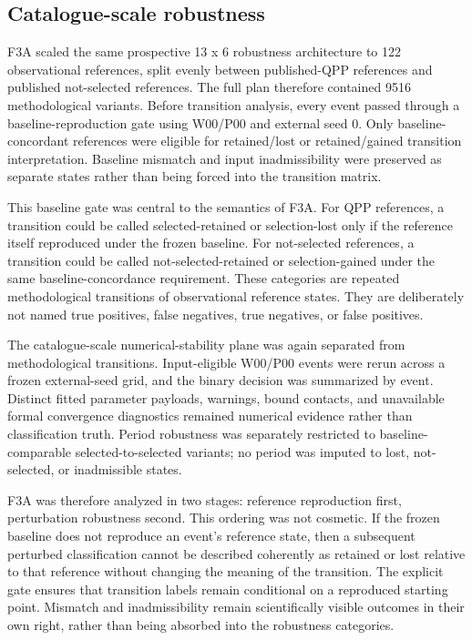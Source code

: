 \documentclass[11pt,a4paper]{article}
\begin{document}
\subsection{Catalogue-scale robustness}
F3A scaled the same prospective 13 x 6 robustness architecture to 122 observational references, split evenly between published-QPP references and published not-selected references. The full plan therefore contained 9516 methodological variants. Before transition analysis, every event passed through a baseline-reproduction gate using W00/P00 and external seed 0. Only baseline-concordant references were eligible for retained/lost or retained/gained transition interpretation. Baseline mismatch and input inadmissibility were preserved as separate states rather than being forced into the transition matrix.

This baseline gate was central to the semantics of F3A. For QPP references, a transition could be called selected-retained or selection-lost only if the reference itself reproduced under the frozen baseline. For not-selected references, a transition could be called not-selected-retained or selection-gained under the same baseline-concordance requirement. These categories are repeated methodological transitions of observational reference states. They are deliberately not named true positives, false negatives, true negatives, or false positives.

The catalogue-scale numerical-stability plane was again separated from methodological transitions. Input-eligible W00/P00 events were rerun across a frozen external-seed grid, and the binary decision was summarized by event. Distinct fitted parameter payloads, warnings, bound contacts, and unavailable formal convergence diagnostics remained numerical evidence rather than classification truth. Period robustness was separately restricted to baseline-comparable selected-to-selected variants; no period was imputed to lost, not-selected, or inadmissible states.

F3A was therefore analyzed in two stages: reference reproduction first, perturbation robustness second. This ordering was not cosmetic. If the frozen baseline does not reproduce an event's reference state, then a subsequent perturbed classification cannot be described coherently as retained or lost relative to that reference without changing the meaning of the transition. The explicit gate ensures that transition labels remain conditional on a reproduced starting point. Mismatch and inadmissibility remain scientifically visible outcomes in their own right, rather than being absorbed into the robustness categories.
\end{document}
